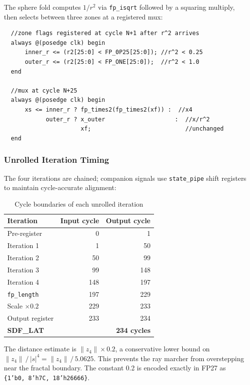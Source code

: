  \noindent The sphere fold computes $1/r^2$ via \texttt{fp\_isqrt} followed
  by a squaring multiply, then selects between three zones at a registered mux:

  \begin{verbatim}
  //zone flags registered at cycle N+1 after r^2 arrives
  always @(posedge clk) begin
      inner_r <= (r2[25:0] < FP_0P25[25:0]); //r^2 < 0.25
      outer_r <= (r2[25:0] < FP_ONE[25:0]);  //r^2 < 1.0
  end

  //mux at cycle N+25
  always @(posedge clk) begin
      xs <= inner_r ? fp_times2(fp_times2(xf)) :  //x4
            outer_r ? x_outer                    :  //x/r^2
                      xf;                           //unchanged
  end
  \end{verbatim}

  \subsubsection*{Unrolled Iteration Timing}

  The four iterations are chained; companion signals use \texttt{state\_pipe}
  shift registers to maintain cycle-accurate alignment:

  \begin{table}[h!]
  \centering
  \caption{Cycle boundaries of each unrolled iteration}
  \begin{tabular}{lrr}
  \hline
  \textbf{Iteration} & \textbf{Input cycle} & \textbf{Output cycle} \\
  \hline
  Pre-register     & 0   & 1   \\
  Iteration 1      & 1   & 50  \\
  Iteration 2      & 50  & 99  \\
  Iteration 3      & 99  & 148 \\
  Iteration 4      & 148 & 197 \\
  \texttt{fp\_length} & 197 & 229 \\
  Scale $\times 0.2$  & 229 & 233 \\
  Output register     & 233 & 234 \\
  \hline
  \textbf{SDF\_LAT} & \multicolumn{2}{r}{\textbf{234 cycles}} \\
  \hline
  \end{tabular}
  \end{table}

  \noindent The distance estimate is $\|z_4\| \times 0.2$, a conservative
  lower bound on $\|z_4\|\,/\,|s|^4 = \|z_4\|\,/\,5.0625$. This prevents
  the ray marcher from overstepping near the fractal boundary. The constant
  0.2 is encoded exactly in FP27 as
  \texttt{\{1'b0,\,8'h7C,\,18'h26666\}}.

